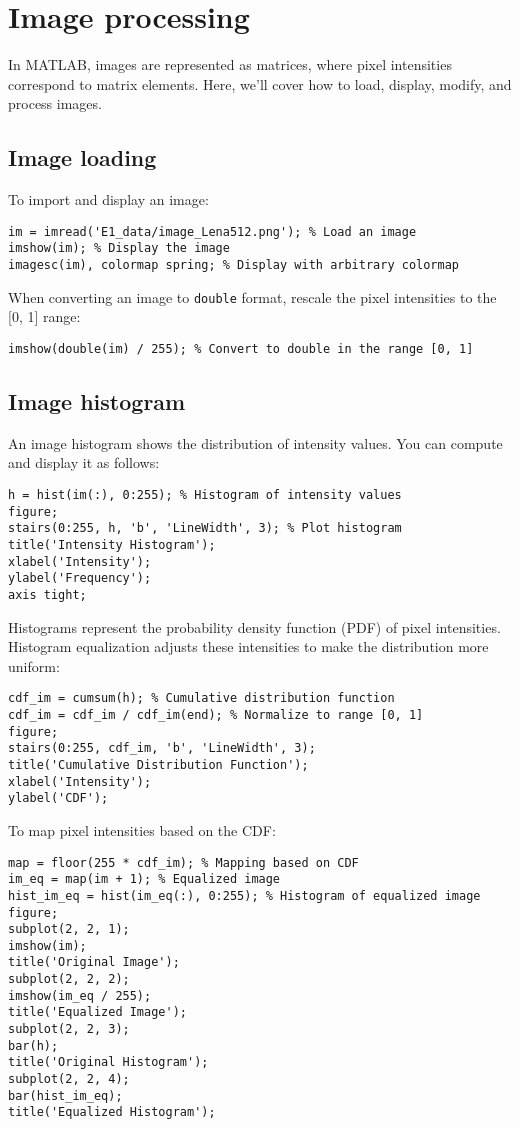 \section{Image processing}

In MATLAB, images are represented as matrices, where pixel intensities correspond to matrix elements. 
Here, we'll cover how to load, display, modify, and process images.

\subsection{Image loading}
To import and display an image: 
\begin{lstlisting}[style=MATLAB] 
im = imread('E1_data/image_Lena512.png'); % Load an image 
imshow(im); % Display the image 
imagesc(im), colormap spring; % Display with arbitrary colormap 
\end{lstlisting}
When converting an image to \texttt{double} format, rescale the pixel intensities to the [0, 1] range: 
\begin{lstlisting}[style=MATLAB] 
imshow(double(im) / 255); % Convert to double in the range [0, 1] 
\end{lstlisting}

\subsection{Image histogram}
An image histogram shows the distribution of intensity values. You can compute and display it as follows: 
\begin{lstlisting}[style=MATLAB] 
h = hist(im(:), 0:255); % Histogram of intensity values 
figure; 
stairs(0:255, h, 'b', 'LineWidth', 3); % Plot histogram 
title('Intensity Histogram'); 
xlabel('Intensity'); 
ylabel('Frequency'); 
axis tight; 
\end{lstlisting}
Histograms represent the probability density function (PDF) of pixel intensities. 
Histogram equalization adjusts these intensities to make the distribution more uniform: 
\begin{lstlisting}[style=MATLAB] 
cdf_im = cumsum(h); % Cumulative distribution function 
cdf_im = cdf_im / cdf_im(end); % Normalize to range [0, 1] 
figure; 
stairs(0:255, cdf_im, 'b', 'LineWidth', 3); 
title('Cumulative Distribution Function'); 
xlabel('Intensity'); 
ylabel('CDF');
\end{lstlisting}
To map pixel intensities based on the CDF: 
\begin{lstlisting}[style=MATLAB] 
map = floor(255 * cdf_im); % Mapping based on CDF 
im_eq = map(im + 1); % Equalized image 
hist_im_eq = hist(im_eq(:), 0:255); % Histogram of equalized image
figure; 
subplot(2, 2, 1); 
imshow(im); 
title('Original Image'); 
subplot(2, 2, 2); 
imshow(im_eq / 255); 
title('Equalized Image'); 
subplot(2, 2, 3);
bar(h); 
title('Original Histogram'); 
subplot(2, 2, 4); 
bar(hist_im_eq); 
title('Equalized Histogram'); 
\end{lstlisting}

